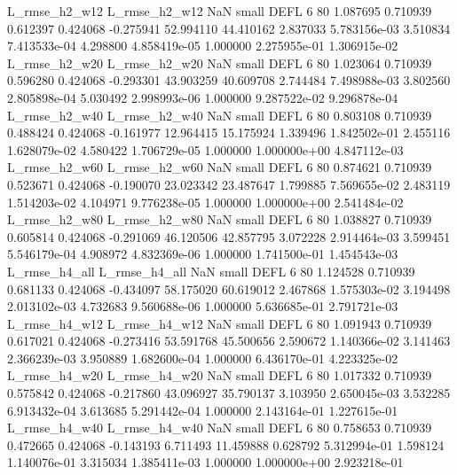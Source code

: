  L_rmse_h2_w12  L_rmse_h2_w12                   NaN      small     DEFL                 6 80 1.087695       0.710939 0.612397       0.424068   -0.275941     52.994110     44.410162     2.837033   5.783156e-03  3.510834 7.413533e-04     4.298800   4.858419e-05            1.000000    2.275955e-01        1.306915e-02
 L_rmse_h2_w20  L_rmse_h2_w20                   NaN      small     DEFL                 6 80 1.023064       0.710939 0.596280       0.424068   -0.293301     43.903259     40.609708     2.744484   7.498988e-03  3.802560 2.805898e-04     5.030492   2.998993e-06            1.000000    9.287522e-02        9.296878e-04
 L_rmse_h2_w40  L_rmse_h2_w40                   NaN      small     DEFL                 6 80 0.803108       0.710939 0.488424       0.424068   -0.161977     12.964415     15.175924     1.339496   1.842502e-01  2.455116 1.628079e-02     4.580422   1.706729e-05            1.000000    1.000000e+00        4.847112e-03
 L_rmse_h2_w60  L_rmse_h2_w60                   NaN      small     DEFL                 6 80 0.874621       0.710939 0.523671       0.424068   -0.190070     23.023342     23.487647     1.799885   7.569655e-02  2.483119 1.514203e-02     4.104971   9.776238e-05            1.000000    1.000000e+00        2.541484e-02
 L_rmse_h2_w80  L_rmse_h2_w80                   NaN      small     DEFL                 6 80 1.038827       0.710939 0.605814       0.424068   -0.291069     46.120506     42.857795     3.072228   2.914464e-03  3.599451 5.546179e-04     4.908972   4.832369e-06            1.000000    1.741500e-01        1.454543e-03
 L_rmse_h4_all  L_rmse_h4_all                   NaN      small     DEFL                 6 80 1.124528       0.710939 0.681133       0.424068   -0.434097     58.175020     60.619012     2.467868   1.575303e-02  3.194498 2.013102e-03     4.732683   9.560688e-06            1.000000    5.636685e-01        2.791721e-03
 L_rmse_h4_w12  L_rmse_h4_w12                   NaN      small     DEFL                 6 80 1.091943       0.710939 0.617021       0.424068   -0.273416     53.591768     45.500656     2.590672   1.140366e-02  3.141463 2.366239e-03     3.950889   1.682600e-04            1.000000    6.436170e-01        4.223325e-02
 L_rmse_h4_w20  L_rmse_h4_w20                   NaN      small     DEFL                 6 80 1.017332       0.710939 0.575842       0.424068   -0.217860     43.096927     35.790137     3.103950   2.650045e-03  3.532285 6.913432e-04     3.613685   5.291442e-04            1.000000    2.143164e-01        1.227615e-01
 L_rmse_h4_w40  L_rmse_h4_w40                   NaN      small     DEFL                 6 80 0.758653       0.710939 0.472665       0.424068   -0.143193      6.711493     11.459888     0.628792   5.312994e-01  1.598124 1.140076e-01     3.315034   1.385411e-03            1.000000    1.000000e+00        2.923218e-01
